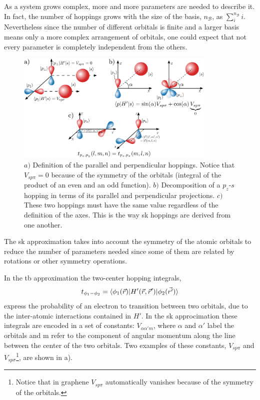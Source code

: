 As a system grows complex, more and more parameters are needed to describe it. In fact, the number of hoppings grows with the size of the basis, $n_\mathcal{B}$, as $\sum^{n_\mathcal{B}}_i i$. Nevertheless since the number of different orbitals is finite and a larger basis means only a more complex arrangement of orbitals, one could expect that not every parameter is completely independent from the others.
\begin{figure}[!ht]
\centering
\includegraphics[width=0.85\textwidth]{graphene/figures/hoppings.pdf}
\vspace{-5pt}
\caption{$a)$ Definition of the parallel and perpendicular hoppings. Notice that $V_{sp\pi}=0$ because of the symmetry of the orbitals (integral of the product of an even and an odd function). $b)$ Decomposition of a $p_z$-$s$ hopping in terms of its parallel and perpendicular projections. $c)$ These two hoppings must have the same value regardless of the definition of the axes. This is the way \ac{sk} hoppings are derived from one another.}
\label{fig:SK}
\end{figure}
The \ac{sk} approximation\cite{Slater1954} takes into account the symmetry of the atomic orbitals to reduce the number of parameters needed since some of them are related by rotations or other symmetry operations.

In the \ac{tb} approximation the two-center hopping integrals\cite{Ashcroft1976, Grosso2000},
$$t_{\phi_1-\phi_2} = \langle\phi_1(\vec{r})|H'(\vec{r},\vec{r}')|\phi_2(\vec{r'})\rangle$$
express the probability of an electron to transition between two orbitals, due to the inter-atomic interactions contained in $H'$. In the \ac{sk} approcimation these integrals are encoded in a set of constants:
$V_{\alpha\alpha'm}$, where $\alpha$ and $\alpha'$ label the orbitals and m refer to the component of angular momentum along the line between the center of the two orbitals. Two examples of these constants, $V_{sp\pi}$ and $V_{sp\sigma}$\footnote{Notice that in graphene $V_{sp\pi}$ automatically vanishes because of the symmetry of the orbitals.}, are shown in a).

